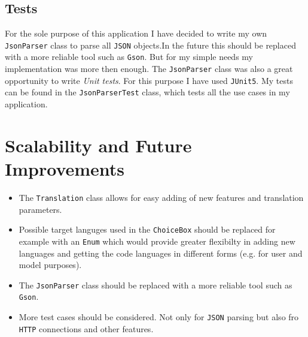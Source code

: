 \documentclass[12pt]{article}
\begin{document}
\subsection{Tests}
For the sole purpose of this application I have decided to write my own \texttt{JsonParser} class to parse all \texttt{JSON} objects.In the future this should be replaced with a more reliable tool such as \texttt{Gson}. But for my simple needs my implementation was more then enough. The \texttt{JsonParser} class was also a great opportunity to write \textit{Unit tests}. For this purpose I have used \texttt{JUnit5}. My tests can be found in the \texttt{JsonParserTest} class, which tests all the use cases in my application.

\section{Scalability and Future Improvements}
\begin{itemize}

\item The \texttt{Translation} class allows for easy adding of new features and translation parameters.
\item Possible target languges used in the \texttt{ChoiceBox} should be replaced for example with an \texttt{Enum} which would provide greater flexibilty in adding new languages and getting the code languages in different forms (e.g. for user and model purposes).
\item The \texttt{JsonParser} class should be replaced with a more reliable tool such as \texttt{Gson}. 
\item More test cases should be considered. Not only for \texttt{JSON} parsing but also fro \texttt{HTTP} connections and other features.
\end{itemize}
\end{document}
